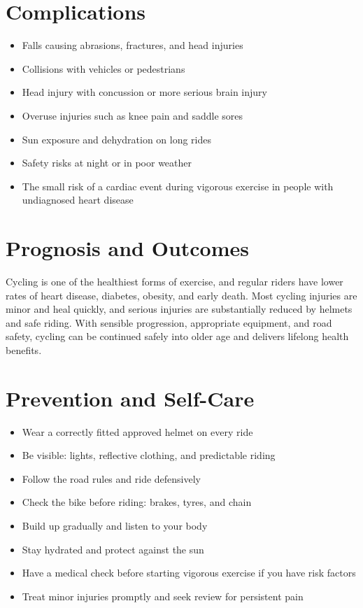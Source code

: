 \section*{Complications}
\begin{itemize}
    \item Falls causing abrasions, fractures, and head injuries
    \item Collisions with vehicles or pedestrians
    \item Head injury with concussion or more serious brain injury
    \item Overuse injuries such as knee pain and saddle sores
    \item Sun exposure and dehydration on long rides
    \item Safety risks at night or in poor weather
    \item The small risk of a cardiac event during vigorous exercise in people with undiagnosed heart disease
\end{itemize}

\section*{Prognosis and Outcomes}
Cycling is one of the healthiest forms of exercise, and regular riders have lower rates of heart disease, diabetes, obesity, and early death. Most cycling injuries are minor and heal quickly, and serious injuries are substantially reduced by helmets and safe riding. With sensible progression, appropriate equipment, and road safety, cycling can be continued safely into older age and delivers lifelong health benefits.

\section*{Prevention and Self-Care}
\begin{itemize}
    \item Wear a correctly fitted approved helmet on every ride
    \item Be visible: lights, reflective clothing, and predictable riding
    \item Follow the road rules and ride defensively
    \item Check the bike before riding: brakes, tyres, and chain
    \item Build up gradually and listen to your body
    \item Stay hydrated and protect against the sun
    \item Have a medical check before starting vigorous exercise if you have risk factors
    \item Treat minor injuries promptly and seek review for persistent pain
\end{itemize}

